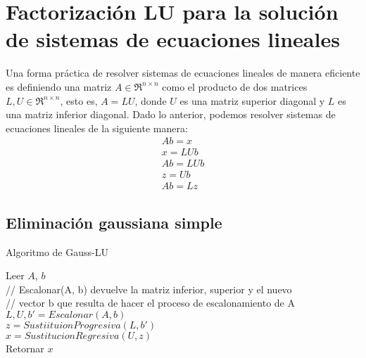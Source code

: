 \documentclass[12pt]{article}
\begin{document}
    \section{Factorización LU para la solución de sistemas de ecuaciones lineales}
    Una forma práctica de resolver sistemas de ecuaciones lineales de manera eficiente es definiendo una matriz $A \in \Re^{n\times n}$ como el producto de dos matrices $L, U \in \Re^{n\times n}$, esto es, $A = LU$, donde $U$ es una matriz superior diagonal y $L$ es una matriz inferior diagonal. Dado lo anterior, podemos resolver sistemas de ecuaciones lineales de la siguiente manera:
    \begin{gather*}
    Ab = x\\
    x = LUb\\
    Ab = LUb\\
    z = Ub\\
    Ab = Lz
    \end{gather*} 
    \subsection{Eliminación gaussiana simple}
    \begin{algorithm}[H]
    	\caption{Algoritmo de Gauss-LU}
    	Leer $A$, $b$\\
    	// Escalonar(A, b) devuelve la matriz inferior, superior y el nuevo\\
    	// vector b que resulta de hacer el proceso de
    	escalonamiento de A\\
    	$L, U, b' = Escalonar(A, b)$ \\
    	$z = SustiituionProgresiva(L, b')$\\
    	$x = SustitucionRegresiva(U, z)$\\
    	Retornar $x$
    \end{algorithm}
\end{document}
